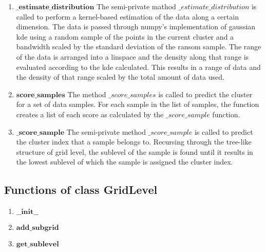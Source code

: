 \begin{enumerate}
    \item $\mathbf{\_estimate\_distribution}$\newline
    {The semi-private mathod $\_estimate\_distribution$ is called to perform a kernel-based estimation of the data along a certain dimension.
    The data is passed through numpy's implementation of gaussian kde using a random sample of the points in the current cluster and a bandwidth scaled by the standard deviation of the ransom sample.
    The range of the data is arranged into a linspace and the density along that range is evaluated according to the kde calculated.
    This results in a range of data and the density of that range scaled by the total amount of data used.}
    \item $\mathbf{score\_samples}$\newline
    {The method $\_score\_samples$ is called to predict the cluster for a set of data samples.
    For each sample in the list of samples, the function creates a list of each score as calculated by the $\_score\_sample$ function.}
    \item $\mathbf{\_score\_sample}$\newline
    {The semi-private method $\_score\_sample$ is called to predict the cluster index that a sample belongs to.
    Recursing through the tree-like structure of grid level, the sublevel of the sample is found until it results in the lowest sublevel of which the sample is assigned the cluster index.}
\end{enumerate}

\subsection{Functions of class GridLevel}
\begin{enumerate}    
    \item $\mathbf{\_\_init\_\_}$\newline
    {}
    \item $\mathbf{add\_subgrid}$\newline
    {}
    \item $\mathbf{get\_sublevel}$\newline
    {}
\end{enumerate}


